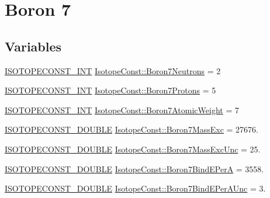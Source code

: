 \hypertarget{group___isotope_const-_boron-_b7}{}\section{Boron 7}
\label{group___isotope_const-_boron-_b7}
\subsection*{Variables}
\begin{DoxyCompactItemize}
\item 
\mbox{\hyperlink{group___isotope_const-_macros_ga5f18360b3e99483a35c32d789e62621c}{I\+S\+O\+T\+O\+P\+E\+C\+O\+N\+S\+T\+\_\+\+I\+NT}} \mbox{\hyperlink{group___isotope_const-_boron-_b7_ga2215646f0b40a36f8341abbcf99a7317}{Isotope\+Const\+::\+Boron7\+Neutrons}} = 2
\item 
\mbox{\hyperlink{group___isotope_const-_macros_ga5f18360b3e99483a35c32d789e62621c}{I\+S\+O\+T\+O\+P\+E\+C\+O\+N\+S\+T\+\_\+\+I\+NT}} \mbox{\hyperlink{group___isotope_const-_boron-_b7_gaa575238950a622be908d0b228178cabb}{Isotope\+Const\+::\+Boron7\+Protons}} = 5
\item 
\mbox{\hyperlink{group___isotope_const-_macros_ga5f18360b3e99483a35c32d789e62621c}{I\+S\+O\+T\+O\+P\+E\+C\+O\+N\+S\+T\+\_\+\+I\+NT}} \mbox{\hyperlink{group___isotope_const-_boron-_b7_ga4c28c36652ff6fb794ca24741a2052af}{Isotope\+Const\+::\+Boron7\+Atomic\+Weight}} = 7
\item 
\mbox{\hyperlink{group___isotope_const-_macros_ga8f45a7272ce02c0b4c65c44636ed719a}{I\+S\+O\+T\+O\+P\+E\+C\+O\+N\+S\+T\+\_\+\+D\+O\+U\+B\+LE}} \mbox{\hyperlink{group___isotope_const-_boron-_b7_ga08919581510750a1ea17b08c44d29174}{Isotope\+Const\+::\+Boron7\+Mass\+Exc}} = 27676.
\item 
\mbox{\hyperlink{group___isotope_const-_macros_ga8f45a7272ce02c0b4c65c44636ed719a}{I\+S\+O\+T\+O\+P\+E\+C\+O\+N\+S\+T\+\_\+\+D\+O\+U\+B\+LE}} \mbox{\hyperlink{group___isotope_const-_boron-_b7_ga5de66b4da638042e4e06b8a2b5ae8caa}{Isotope\+Const\+::\+Boron7\+Mass\+Exc\+Unc}} = 25.
\item 
\mbox{\hyperlink{group___isotope_const-_macros_ga8f45a7272ce02c0b4c65c44636ed719a}{I\+S\+O\+T\+O\+P\+E\+C\+O\+N\+S\+T\+\_\+\+D\+O\+U\+B\+LE}} \mbox{\hyperlink{group___isotope_const-_boron-_b7_ga46a7e56bed8364a670f538b2285addb7}{Isotope\+Const\+::\+Boron7\+Bind\+E\+PerA}} = 3558.
\item 
\mbox{\hyperlink{group___isotope_const-_macros_ga8f45a7272ce02c0b4c65c44636ed719a}{I\+S\+O\+T\+O\+P\+E\+C\+O\+N\+S\+T\+\_\+\+D\+O\+U\+B\+LE}} \mbox{\hyperlink{group___isotope_const-_boron-_b7_ga94a6715e5b083619213565cc81dbf9ce}{Isotope\+Const\+::\+Boron7\+Bind\+E\+Per\+A\+Unc}} = 3.

\end{DoxyCompactItemize}
